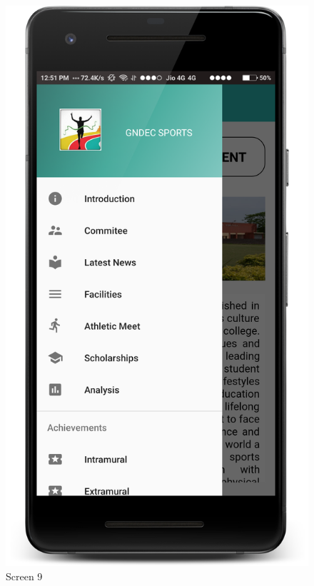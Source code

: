 \begin{figure}[ht]
\centering
\includegraphics[scale=0.13]{images/S9.png}
\caption{Screen 9}
\end{figure}

\newpage

